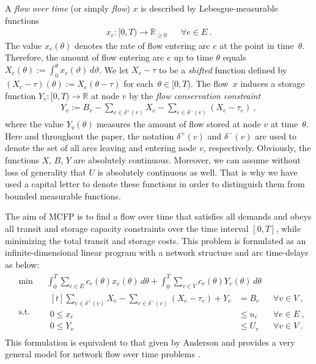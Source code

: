 \documentclass{svjour3}                     \smartqed
\newcommand{\rr}{\ensuremath{\mathbb{R}}}
\begin{document}
A \emph{flow over time} (or simply \emph{flow}) $x$ is described by Lebesgue-measurable  functions
\begin{align*}
x_e:[0,T)\longrightarrow \rr_{\geq 0} &&\forall e\in E~.
\end{align*}
The value $x_{e}(\theta)$ denotes the rate of flow entering arc $e$ at the point in time~$\theta$. Therefore, the amount of flow entering arc $e$ up to time $\theta$ equals $X_e(\theta):=\int_{0}^{\theta}x_e(\vartheta)\,d\vartheta$. We let $X_e-\tau$ to be a \emph{shifted} function defined by $(X_e-\tau)(\theta):=X_e(\theta-\tau)$ for each~${\theta\in [0,T)}$. The flow~$x$ induces a storage function $Y_v:[0,T)\longrightarrow \rr$ at node $v$ by the {\em flow conservation constraint}
\begin{align}
\label{eq:FCC}
Y_v:=B_v-\sum_{e\in\delta^+(v)} X_e-\sum_{e\in\delta^-(v)} (X_e-\tau_e)~,
\end{align}
where the value $Y_v(\theta)$ measures the amount of flow stored at node $v$ at time~$\theta$. Here and throughout the paper, the notation $\delta^+(v)$ and $\delta^-(v)$ are used to denote the set of all arcs leaving and entering node $v$, respectively. Obviously, the functions $X$, $B$, $Y$ are absolutely continuous. Moreover, we can assume without loss of generality that $U$ is absolutely continuous as well. That is why we have used a capital letter to denote these functions in order to distinguish them from bounded measurable functions.


The aim of MCFP is to find a flow over time that satisfies all demands and obeys
all transit and storage capacity constraints over the time
interval $[0,T]$, while minimizing the total transit and storage costs.
This problem is formulated as an infinite-dimensional
linear program with a network structure and arc time-delays as below:
\begin{align}
\label{pro:MCFP}
  \tag{MCFP}
  \begin{aligned}
    &\min && \int_{0}^{T}\sum_{e\in E} c_e(\theta) x_e(\theta)\,d\theta+\int_{0}^{T}\sum_{v\in V} c_v(\theta) Y_v(\theta)\,d\theta\\
    &\text{s.t.}
      &&\begin{aligned}[t]
        \sum_{e\in\delta^+(v)} X_e-\sum_{e\in\delta^-(v)} (X_e-\tau_e)+Y_v&= B_v &&\forall v\in V~,\\
        0 \leq x_e &\leq u_e &&\forall e\in E~,\\
        0 \leq Y_v &\leq U_v &&\forall v\in V~.
      \end{aligned}
  \end{aligned}
\end{align}
This formulation is equivalent to that given by Anderson \cite{Anderson89} and provides a very general model for network flow over time problems . 
\end{document}
